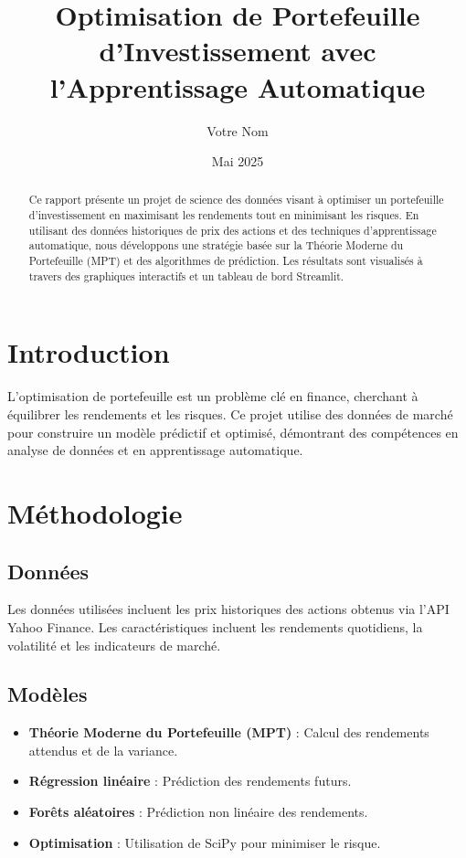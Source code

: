 \documentclass[a4paper,12pt]{article}
\begin{document}
\title{Optimisation de Portefeuille d'Investissement avec l'Apprentissage Automatique}
\author{Votre Nom}
\date{Mai 2025}
\maketitle

\begin{abstract}
Ce rapport présente un projet de science des données visant à optimiser un portefeuille d'investissement en maximisant les rendements tout en minimisant les risques. En utilisant des données historiques de prix des actions et des techniques d'apprentissage automatique, nous développons une stratégie basée sur la Théorie Moderne du Portefeuille (MPT) et des algorithmes de prédiction. Les résultats sont visualisés à travers des graphiques interactifs et un tableau de bord Streamlit.
\end{abstract}

\section{Introduction}
L'optimisation de portefeuille est un problème clé en finance, cherchant à équilibrer les rendements et les risques. Ce projet utilise des données de marché pour construire un modèle prédictif et optimisé, démontrant des compétences en analyse de données et en apprentissage automatique.

\section{Méthodologie}
\subsection{Données}
Les données utilisées incluent les prix historiques des actions obtenus via l'API Yahoo Finance. Les caractéristiques incluent les rendements quotidiens, la volatilité et les indicateurs de marché.

\subsection{Modèles}
\begin{itemize}
    \item \textbf{Théorie Moderne du Portefeuille (MPT)} : Calcul des rendements attendus et de la variance.
    \item \textbf{Régression linéaire} : Prédiction des rendements futurs.
    \item \textbf{Forêts aléatoires} : Prédiction non linéaire des rendements.
    \item \textbf{Optimisation} : Utilisation de SciPy pour minimiser le risque.
\end{itemize}
\end{document}
